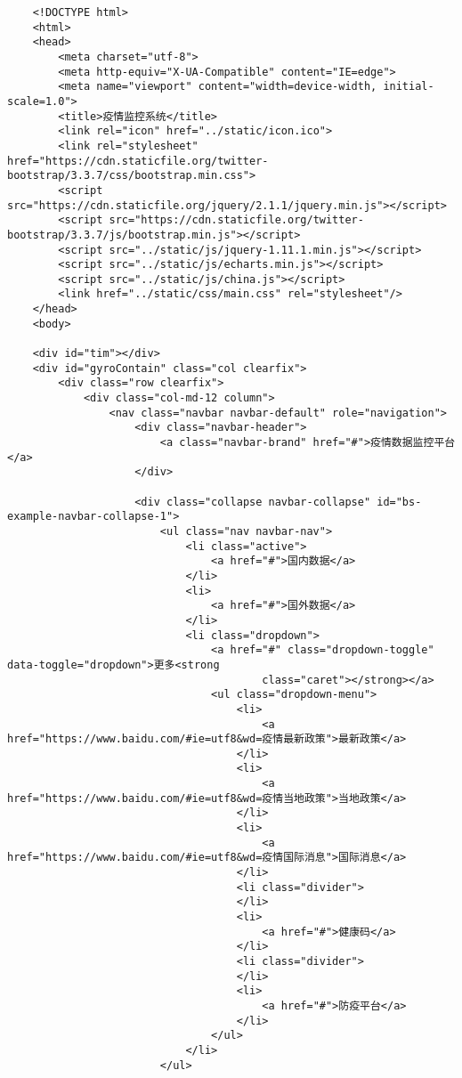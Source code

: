 \begin{lstlisting}
    <!DOCTYPE html>
    <html>
    <head>
        <meta charset="utf-8">
        <meta http-equiv="X-UA-Compatible" content="IE=edge">
        <meta name="viewport" content="width=device-width, initial-scale=1.0">
        <title>疫情监控系统</title>
        <link rel="icon" href="../static/icon.ico">
        <link rel="stylesheet" href="https://cdn.staticfile.org/twitter-bootstrap/3.3.7/css/bootstrap.min.css">
        <script src="https://cdn.staticfile.org/jquery/2.1.1/jquery.min.js"></script>
        <script src="https://cdn.staticfile.org/twitter-bootstrap/3.3.7/js/bootstrap.min.js"></script>
        <script src="../static/js/jquery-1.11.1.min.js"></script>
        <script src="../static/js/echarts.min.js"></script>
        <script src="../static/js/china.js"></script>
        <link href="../static/css/main.css" rel="stylesheet"/>
    </head>
    <body>
    
    <div id="tim"></div>
    <div id="gyroContain" class="col clearfix">
        <div class="row clearfix">
            <div class="col-md-12 column">
                <nav class="navbar navbar-default" role="navigation">
                    <div class="navbar-header">
                        <a class="navbar-brand" href="#">疫情数据监控平台</a>
                    </div>
    
                    <div class="collapse navbar-collapse" id="bs-example-navbar-collapse-1">
                        <ul class="nav navbar-nav">
                            <li class="active">
                                <a href="#">国内数据</a>
                            </li>
                            <li>
                                <a href="#">国外数据</a>
                            </li>
                            <li class="dropdown">
                                <a href="#" class="dropdown-toggle" data-toggle="dropdown">更多<strong
                                        class="caret"></strong></a>
                                <ul class="dropdown-menu">
                                    <li>
                                        <a href="https://www.baidu.com/#ie=utf8&wd=疫情最新政策">最新政策</a>
                                    </li>
                                    <li>
                                        <a href="https://www.baidu.com/#ie=utf8&wd=疫情当地政策">当地政策</a>
                                    </li>
                                    <li>
                                        <a href="https://www.baidu.com/#ie=utf8&wd=疫情国际消息">国际消息</a>
                                    </li>
                                    <li class="divider">
                                    </li>
                                    <li>
                                        <a href="#">健康码</a>
                                    </li>
                                    <li class="divider">
                                    </li>
                                    <li>
                                        <a href="#">防疫平台</a>
                                    </li>
                                </ul>
                            </li>
                        </ul>
    

\end{lstlisting}
